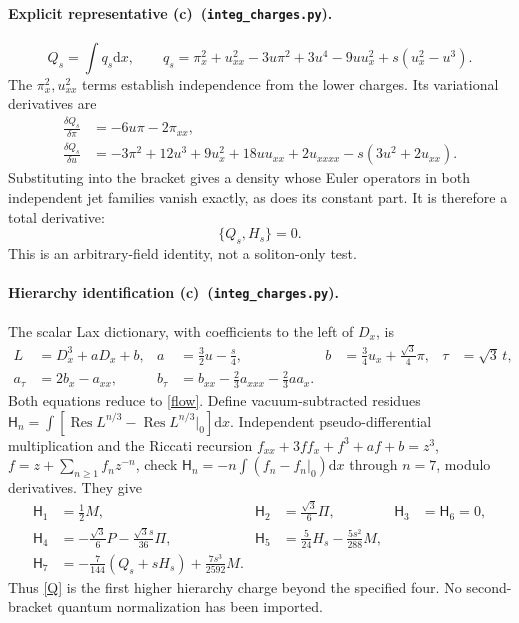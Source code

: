 \documentclass[11pt,a4paper]{article}
\newcommand{\C}{\textbf{(c)}\ }
\newcommand{\dd}{\mathrm d}
\newcommand{\file}[1]{\nolinkurl{#1}}
\newcommand{\chg}{\file{integ_charges.py}}
\begin{document}
\paragraph{Explicit representative \C (\chg).}
\begin{equation}
 \boxed{Q_s=\int q_s\dd x,\qquad
 q_s=\pi_x^2+u_{xx}^2-3u\pi^2+3u^4-9uu_x^2+s(u_x^2-u^3).}\label{Q}
\end{equation}
The $\pi_x^2,u_{xx}^2$ terms establish independence from the lower charges.
Its variational derivatives are
\begin{align}
 \frac{\delta Q_s}{\delta\pi}&=-6u\pi-2\pi_{xx},\\
 \frac{\delta Q_s}{\delta u}&=-3\pi^2+12u^3+9u_x^2+18uu_{xx}
                  +2u_{xxxx}-s(3u^2+2u_{xx}).\label{variations}
\end{align}
Substituting into the bracket gives a density whose Euler operators in
both independent jet families vanish exactly, as does its constant part.
It is therefore a total derivative:
\begin{equation}
 \boxed{\{Q_s,H_s\}=0.}\label{conservation}
\end{equation}
This is an arbitrary-field identity, not a soliton-only test.

\paragraph{Hierarchy identification \C (\chg).}
The scalar Lax dictionary, with coefficients to the left of $D_x$, is
\begin{align}
 L&=D_x^3+aD_x+b,&a&=\tfrac32u-\tfrac{s}{4},&
 b&=\tfrac34u_x+\tfrac{\sqrt3}{4}\pi,&\tau&=\sqrt3\,t,\\
 a_\tau&=2b_x-a_{xx},&
 b_\tau&=b_{xx}-\tfrac23a_{xxx}-\tfrac23aa_x.&&&
\end{align}
Both equations reduce to \eqref{flow}. Define vacuum-subtracted residues
$\mathsf{H}_n=\int[\operatorname{Res}L^{n/3}-\operatorname{Res}L^{n/3}|_0]\dd x$.
Independent pseudo-differential multiplication and the Riccati recursion
$f_{xx}+3ff_x+f^3+af+b=z^3$, $f=z+\sum_{n\geq1}f_nz^{-n}$,
check $\mathsf{H}_n=-n\int(f_n-f_n|_0)\dd x$ through $n=7$, modulo derivatives.
They give
\begin{align}
 \mathsf{H}_1&=\tfrac12M,&\mathsf{H}_2&=\tfrac{\sqrt3}{6}\Pi,&\mathsf{H}_3&=\mathsf{H}_6=0,\\
 \mathsf{H}_4&=-\tfrac{\sqrt3}{6}P-\tfrac{\sqrt3 s}{36}\Pi,&
 \mathsf{H}_5&=\tfrac5{24}H_s-\tfrac{5s^2}{288}M,\\
 \mathsf{H}_7&=-\tfrac7{144}(Q_s+sH_s)+\tfrac{7s^3}{2592}M.\label{hierarchy}
\end{align}
Thus \eqref{Q} is the first higher hierarchy charge beyond the specified
four. No second-bracket quantum normalization has been imported.
\end{document}
